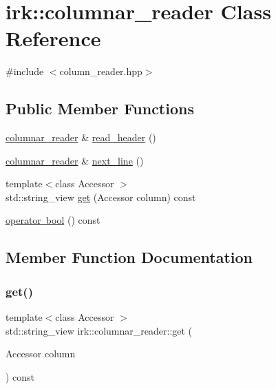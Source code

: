 \hypertarget{classirk_1_1columnar__reader}{}\section{irk\+:\+:columnar\+\_\+reader Class Reference}
\label{classirk_1_1columnar__reader}


{\ttfamily \#include $<$column\+\_\+reader.\+hpp$>$}

\subsection*{Public Member Functions}
\begin{DoxyCompactItemize}
\item 
\mbox{\hyperlink{classirk_1_1columnar__reader}{columnar\+\_\+reader}} \& \mbox{\hyperlink{classirk_1_1columnar__reader_ac4d65bada006d0b99b569c15e6001a6e}{read\+\_\+header}} ()
\item 
\mbox{\hyperlink{classirk_1_1columnar__reader}{columnar\+\_\+reader}} \& \mbox{\hyperlink{classirk_1_1columnar__reader_a543757a48878cad7907736d1a2608bea}{next\+\_\+line}} ()
\item 
{\footnotesize template$<$class Accessor $>$ }\\std\+::string\+\_\+view \mbox{\hyperlink{classirk_1_1columnar__reader_aff87f04c5cc74aa6dadd0a4b150ce1db}{get}} (Accessor column) const
\item 
\mbox{\hyperlink{classirk_1_1columnar__reader_aad00b13b59559e7be029d7cc0766cd0f}{operator bool}} () const
\end{DoxyCompactItemize}


\subsection{Member Function Documentation}
\mbox{\label{classirk_1_1columnar__reader_aff87f04c5cc74aa6dadd0a4b150ce1db}} 
\subsubsection{\texorpdfstring{get()}{get()}}
{\footnotesize\ttfamily template$<$class Accessor $>$ \\
std\+::string\+\_\+view irk\+::columnar\+\_\+reader\+::get (\begin{DoxyParamCaption}\item[{Accessor}]{column }\end{DoxyParamCaption}) const\hspace{0.3cm}{\ttfamily [inline]}}

